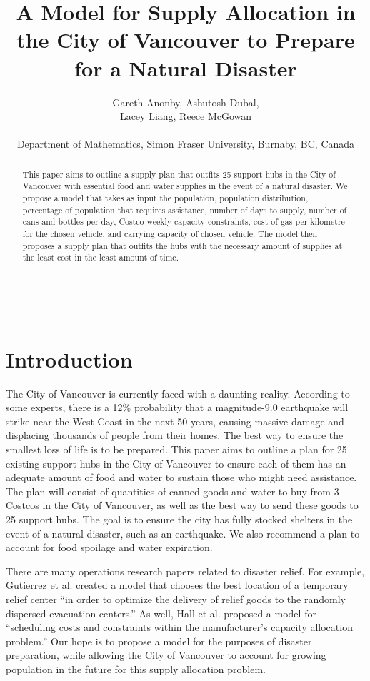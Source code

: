 \documentclass{article}
\title{A Model for Supply Allocation in the City of Vancouver to Prepare for a Natural Disaster}
\author{Gareth Anonby, Ashutosh Dubal,\\ Lacey Liang, Reece McGowan\\\\
Department of Mathematics, Simon Fraser University, Burnaby, BC, Canada}
\date{}
\begin{document}
\maketitle

\

\begin{abstract}
     This paper aims to outline a supply plan that outfits 25 support hubs in the City of Vancouver with essential food and water supplies in the event of a natural disaster. We propose a model that takes as input the population, population distribution, percentage of population that requires assistance, number of days to supply, number of cans and bottles per day, Costco weekly capacity constraints, cost of gas per kilometre for the chosen vehicle, and carrying capacity of chosen vehicle. The model then proposes a supply plan that outfits the hubs with the necessary amount of supplies at the least cost in the least amount of time. 
\end{abstract}

\newpage

\section{Introduction}

\indent The City of Vancouver is currently faced with a daunting reality. According to some experts, there is a 12\% probability that a magnitude-9.0 earthquake  will strike near the West Coast in the next 50 years, causing massive damage and displacing thousands of people from their homes. The best way to ensure the smallest loss of life is to be prepared. This paper aims to outline a plan for 25 existing support hubs in the City of Vancouver to ensure each of them has an adequate amount of food and water to sustain those who might need assistance. The plan will consist of quantities of canned goods and water to buy from 3 Costcos in the City of Vancouver, as well as the best way to send these goods to 25 support hubs. The goal is to ensure the city has fully stocked shelters in the event of a natural disaster, such as an earthquake. We also recommend a plan to account for food spoilage and water expiration.

There are many operations research papers related to disaster relief. For example, Gutierrez et al. created a model that chooses the best location of a temporary relief center ``in order to optimize the delivery of relief goods to the randomly dispersed evacuation centers.''\cite{humanitariansupplychain} As well, Hall et al. proposed a model for ``scheduling costs and constraints within the manufacturer's capacity allocation problem.''\cite{supplyallocation} Our hope is to propose a model for the purposes of disaster preparation, while allowing the City of Vancouver to account for growing population in the future for this supply allocation problem. 
\end{document}
